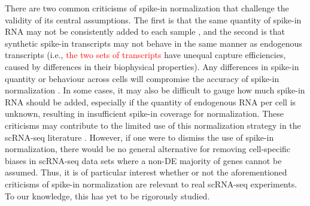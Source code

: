 \documentclass{article}
\newcommand{\revised}[1]{\textcolor{red}{#1}}
\begin{document}
There are two common criticisms of spike-in normalization that challenge the validity of its central assumptions.
The first is that the same quantity of spike-in RNA may not be consistently added to each sample \autocite{robinson2010tmm}, and the second is that synthetic spike-in transcripts may not behave in the same manner as endogenous transcripts \autocite{grun2015design} (i.e., \revised{the two sets of transcripts} have unequal capture efficiencies, caused by differences in their biophysical properties).
Any differences in spike-in quantity or behaviour across cells will compromise the accuracy of spike-in normalization \autocite{risso2014normalization}.
In some cases, it may also be difficult to gauge how much spike-in RNA should be added, especially if the quantity of endogenous RNA per cell is unknown, resulting in insufficient spike-in coverage for normalization.
These criticisms may contribute to the limited use of this normalization strategy in the scRNA-seq literature \autocite{bacher2016design}.
However, if one were to dismiss the use of spike-in normalization, there would be no general alternative for removing cell-specific biases in scRNA-seq data sets where a non-DE majority of genes cannot be assumed.
Thus, it is of particular interest whether or not the aforementioned criticisms of spike-in normalization are relevant to real scRNA-seq experiments.
To our knowledge, this has yet to be rigorously studied.

% 
\end{document}
